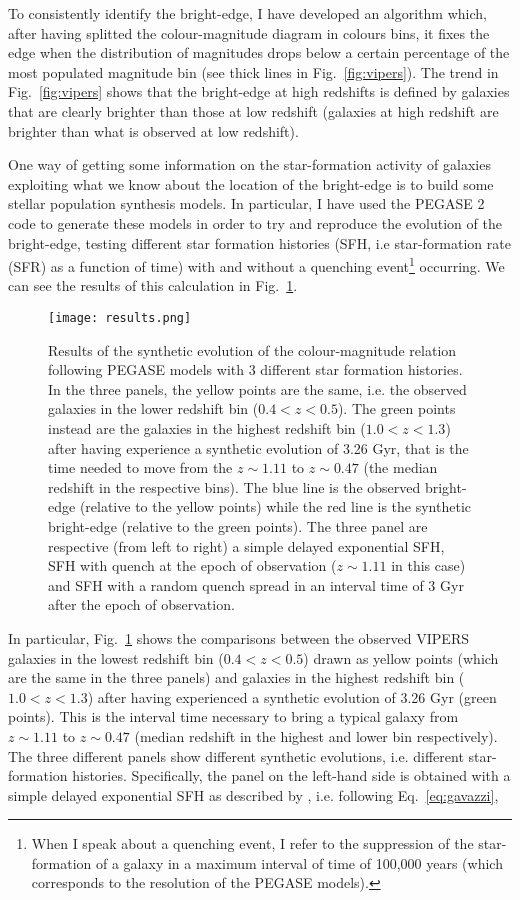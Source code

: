 \documentclass[11pt]{article}
\begin{document}
To consistently identify the bright-edge, I have developed an algorithm which, after having splitted the colour-magnitude diagram in colours bins, it fixes the edge when the distribution of magnitudes drops below a certain percentage of the most populated magnitude bin (see thick lines in Fig.~\ref{fig:vipers}). 
The trend in Fig.~\ref{fig:vipers} shows that the bright-edge at high redshifts is defined by galaxies that are clearly brighter than those at low redshift (galaxies at high redshift are brighter than what is observed at low redshift). 

One way of getting some information on the star-formation activity of galaxies exploiting what we know about the location of the bright-edge is to build some stellar population synthesis models. 
In particular, I have used the PEGASE 2 code to generate these models in order to try and reproduce the evolution of the bright-edge, testing different star formation histories (SFH, i.e star-formation rate (SFR) as a function of time) with and without a quenching event\footnote{When I speak about a quenching event, I refer to the suppression of the star-formation of a galaxy in a maximum interval of time of 100,000 years (which corresponds to the resolution of the PEGASE models).} occurring. 
We can see the results of this calculation in Fig.~\ref{fig:vipers_results}.
%
\begin{figure}
\centering
\texttt{[image: results.png]}
\caption{Results of the synthetic evolution of the colour-magnitude relation following PEGASE models with 3 different star formation histories. In the three panels, the yellow points are the same, i.e. the observed galaxies in the lower redshift bin ($0.4<z<0.5$). The green points instead are the galaxies in the highest redshift bin ($1.0<z<1.3$) after having experience a synthetic evolution of 3.26 Gyr, that is the time needed to move from the $z\sim 1.11$ to $z\sim 0.47$ (the median redshift in the respective bins). The blue line is the observed bright-edge (relative to the yellow points) while the red line is the synthetic bright-edge (relative to the green points). The three panel are respective (from left to right) a simple delayed exponential SFH, SFH with quench at the epoch of observation ($z\sim1.11$ in this case) and SFH with a random quench spread in an interval time of 3 Gyr after the epoch of observation. }
\label{fig:vipers_results}
\end{figure}
%
In particular, Fig.~\ref{fig:vipers_results} shows the comparisons between the observed VIPERS galaxies in the lowest redshift bin ($0.4<z<0.5$) drawn as yellow points (which are the same in the three panels) and galaxies in the highest redshift bin ($1.0<z<1.3$) after having experienced a synthetic evolution of 3.26 Gyr (green points). This is the interval time necessary to bring a typical galaxy from $z\sim1.11$ to $z\sim0.47$ (median redshift in the highest and lower bin respectively). The three different panels show different synthetic evolutions, i.e. different star-formation histories. Specifically, the panel on the left-hand side is obtained with a simple delayed exponential SFH as described by \cite{gavazzi02}, i.e. following Eq.~\ref{eq:gavazzi}, 
\end{document}
